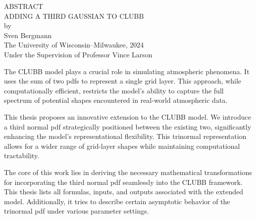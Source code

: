 \begin{center}
    ABSTRACT
    \\
    \singlespacing
    ADDING A THIRD GAUSSIAN TO CLUBB\\
    \doublespacing
    by\\
    Sven Bergmann\\
    \singlespacing
    The University of Wisconsin--Milwaukee, 2024\\
    Under the Supervision of Professor Vince Larson
\end{center}

The \gls{CLUBB} model plays a crucial role in simulating atmospheric phenomena.
It uses the sum of two \glspl{pdf} to represent a single grid layer.
This approach, while computationally efficient,
restricts the model's ability to capture the full spectrum of potential shapes encountered in real-world atmospheric data.

This thesis proposes an innovative extension to the \gls{CLUBB} model.
We introduce a third normal \gls{pdf} strategically positioned between the existing two,
significantly enhancing the model's representational flexibility.
This trinormal representation allows for a wider range of grid-layer shapes while maintaining computational tractability.

The core of this work lies in deriving the necessary mathematical transformations
for incorporating the third normal \gls{pdf} seamlessly into the \gls{CLUBB} framework.
This thesis lists all formulas, inputs, and outputs associated with the extended model.
Additionally,
it tries to describe certain asymptotic behavior of the trinormal \gls{pdf} under various parameter settings.
